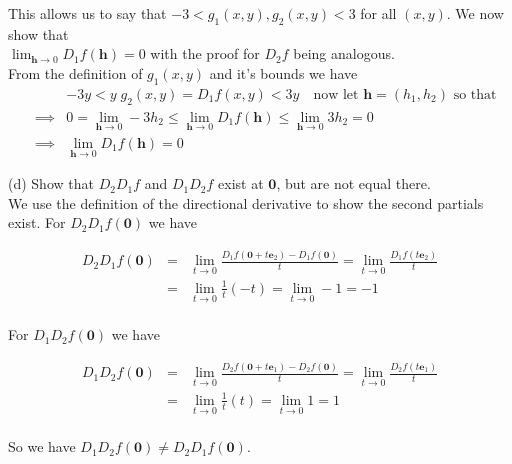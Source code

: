 \documentclass[11pt,reqno]{article}
\begin{document}
This allows us to say that $-3 < g_1(x,y), g_2(x,y) < 3$ for all $(x,y)$. We now show that\\ $\lim_{\textbf{h} \to 0} D_1 f(\textbf{h}) = 0$ with the proof for $D_2 f$ being analogous.\\

\noindent From the definition of $g_1(x,y)$ and it's bounds we have 
\begin{eqnarray*}
 & &-3 y < y \;g_2(x,y) = D_1 f(x,y) < 3 y \quad \text{now let $\textbf{h} = (h_1,h_2)$ so that} \\
 &\implies& 0 = \lim_{\textbf{h} \to 0} - 3 h_2 \le  \lim_{\textbf{h} \to 0} D_1 f(\textbf{h}) \le \lim_{\textbf{h} \to 0}  3 h_2 = 0 \\
 &\implies&  \lim_{\textbf{h} \to 0} D_1 f(\textbf{h}) = 0
\end{eqnarray*}


\noindent (d) Show that $D_2 D_1 f$ and $D_1 D_2 f$ exist at $\textbf{0}$, but are not equal there.\\

We use the definition of the directional derivative to show the second partials exist. For $D_2 D_1 f(\textbf{0})$ we have

\begin{eqnarray*}
D_2 D_1 f(\textbf{0}) &=& \lim_{t \to 0} \frac{D_1 f(\textbf{0} + t \textbf{e}_2) - D_1 f(\textbf{0})}{t} =  \lim_{t \to 0} \frac{D_1 f(t \textbf{e}_2)}{t}\\
			&=& \lim_{t \to 0} \frac{1}{t} (-t) = \lim_{t \to 0} -1  = -1 \\
\end{eqnarray*}

\noindent For $D_1 D_2 f(\textbf{0})$ we have

\begin{eqnarray*}
D_1 D_2 f(\textbf{0}) &=& \lim_{t \to 0} \frac{D_2 f(\textbf{0} + t \textbf{e}_1) - D_2 f(\textbf{0})}{t} =  \lim_{t \to 0} \frac{D_2 f(t \textbf{e}_1)}{t}\\
			&=& \lim_{t \to 0} \frac{1}{t} (t) = \lim_{t \to 0} 1  =  1\\
\end{eqnarray*}

\noindent So we have $D_1 D_2 f(\textbf{0}) \neq D_2 D_1 f(\textbf{0})$.
\end{document}
